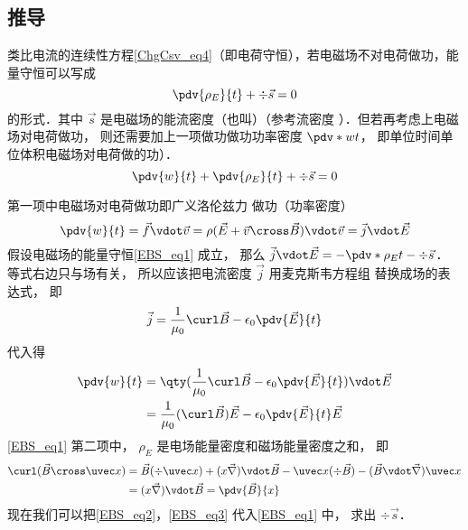 \subsection{推导}
类比电流的连续性方程\autoref{ChgCsv_eq4}（即电荷守恒），若电磁场不对电荷做功，能量守恒可以写成
\begin{equation}
\pdv{\rho_E}{t} + \div \vec s = 0
\end{equation} 
的形式．其中 $\vec s$ 是电磁场的能流密度（也叫）（参考流密度%
）．但若再考虑上电磁场对电荷做功， 则还需要加上一项做功做功功率密度 $\pdv*{w}{t}$， 即单位时间单位体积电磁场对电荷做的功）．
\begin{equation}\label{EBS_eq1}
\pdv{w}{t} + \pdv{\rho_E}{t} + \div \vec s = 0
\end{equation} 

第一项中电磁场对电荷做功即广义洛伦兹力%
做功（功率密度）
\begin{equation}
\pdv{w}{t} = \vec f \vdot \vec v = \rho (\vec E + \vec v \cross \vec B) \vdot \vec v = \vec j \vdot \vec E
\end{equation} 
假设电磁场的能量守恒\autoref{EBS_eq1} 成立， 那么 $\vec j \vdot \vec E =  - \pdv*{\rho_E}{t} - \div \vec s$． 等式右边只与场有关， 所以应该把电流密度 $\vec j$ 用麦克斯韦方程组%
替换成场的表达式， 即
\begin{equation}
\vec j = \frac{1}{\mu_0} \curl \vec B - \epsilon_0 \pdv{\vec E}{t}
\end{equation} 
代入得
\begin{equation}\label{EBS_eq2}
\begin{aligned}
\pdv{w}{t} &= \qty(\frac{1}{\mu_0} \curl \vec B - \epsilon_0 \pdv{\vec E}{t}) \vdot \vec E\\
&= \frac{1}{\mu_0} (\curl \vec B)\vec E - \epsilon_0 \pdv{\vec E}{t} \vec E
\end{aligned}
\end{equation} 
\autoref{EBS_eq1} 第二项中， $\rho_E$ 是电场能量密度和磁场能量密度之和， 即
\begin{equation}\label{EBS_eq3}
\begin{aligned}
\curl (\vec B \cross \uvec x) &= \vec B(\div \uvec x) + (x\vec\nabla) \vdot\vec B - \uvec x( \div \vec B) - (\vec B\vdot\vec\nabla)\uvec x \\
&= (x\vec\nabla)\vdot\vec B = \pdv{\vec B}{x}
\end{aligned}\end{equation} 
现在我们可以把\autoref{EBS_eq2}，\autoref{EBS_eq3} 代入\autoref{EBS_eq1} 中， 求出 $\div \vec s$． 
